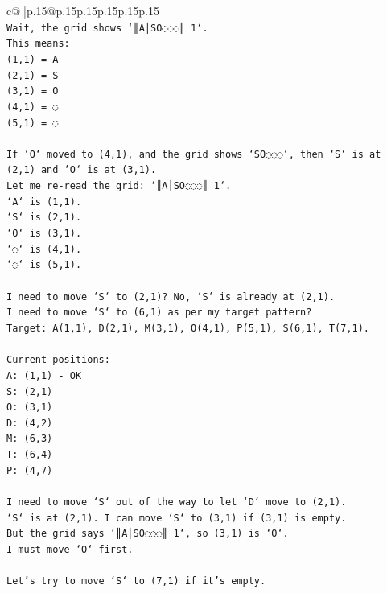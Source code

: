 \documentclass{article}
\begin{document}
{\begin{supertabular}{c@{$\;$}|p{.15\linewidth}@{}p{.15\linewidth}p{.15\linewidth}p{.15\linewidth}p{.15\linewidth}p{.15\linewidth}}
{{{\\ 
\texttt{Wait, the grid shows `║A│SO◌◌◌║ 1`.} \\
\texttt{This means:} \\
\texttt{(1,1) = A} \\
\texttt{(2,1) = S} \\
\texttt{(3,1) = O} \\
\texttt{(4,1) = ◌} \\
\texttt{(5,1) = ◌} \\
\\ 
\texttt{If `O` moved to (4,1), and the grid shows `SO◌◌◌`, then `S` is at (2,1) and `O` is at (3,1).} \\
\texttt{Let me re{-}read the grid: `║A│SO◌◌◌║ 1`.} \\
\texttt{`A` is (1,1).} \\
\texttt{`S` is (2,1).} \\
\texttt{`O` is (3,1).} \\
\texttt{`◌` is (4,1).} \\
\texttt{`◌` is (5,1).} \\
\\ 
\texttt{I need to move `S` to (2,1)? No, `S` is already at (2,1).} \\
\texttt{I need to move `S` to (6,1) as per my target pattern?} \\
\texttt{Target: A(1,1), D(2,1), M(3,1), O(4,1), P(5,1), S(6,1), T(7,1).} \\
\\ 
\texttt{Current positions:} \\
\texttt{A: (1,1) {-} OK} \\
\texttt{S: (2,1)} \\
\texttt{O: (3,1)} \\
\texttt{D: (4,2)} \\
\texttt{M: (6,3)} \\
\texttt{T: (6,4)} \\
\texttt{P: (4,7)} \\
\\ 
\texttt{I need to move `S` out of the way to let `D` move to (2,1).} \\
\texttt{`S` is at (2,1). I can move `S` to (3,1) if (3,1) is empty.} \\
\texttt{But the grid says `║A│SO◌◌◌║ 1`, so (3,1) is `O`.} \\
\texttt{I must move `O` first.} \\
\\ 
\texttt{Let's try to move `S` to (7,1) if it's empty.} \\
}}}
\end{supertabular}}
\end{document}
